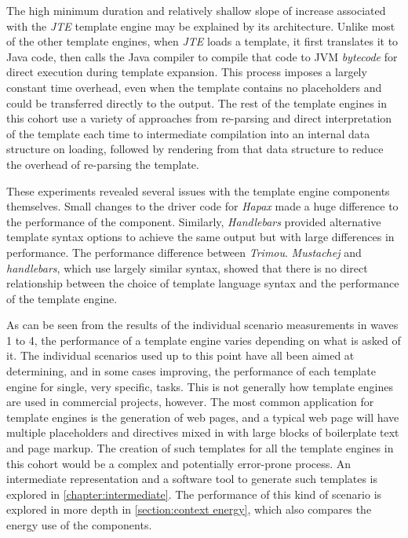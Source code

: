 The high minimum duration and relatively shallow slope of increase associated with the \emph{JTE} template engine may be explained by its architecture. Unlike most of the other template engines, when \emph{JTE} loads a template, it first translates it to Java code, then calls the Java compiler to compile that code to JVM \emph{bytecode} for direct execution during template expansion. This process imposes a largely constant time overhead, even when the template contains no placeholders and could be transferred directly to the output. The rest of the template engines in this cohort use a variety of approaches from re-parsing and direct interpretation of the template each time to intermediate compilation into an internal data structure on loading, followed by rendering from that data structure to reduce the overhead of re-parsing the template.

These experiments revealed several issues with the template engine components themselves. Small changes to the driver code for \emph{Hapax} made a huge difference to the performance of the component. Similarly, \emph{Handlebars} provided alternative template syntax options to achieve the same output but with large differences in performance. The performance difference between \emph{Trimou}. \emph{Mustachej} and \emph{handlebars}, which use largely similar syntax, showed that there is no direct relationship between the choice of template language syntax and the performance of the template engine.

As can be seen from the results of the individual scenario measurements in waves 1 to 4, the performance of a template engine varies depending on what is asked of it. The individual scenarios used up to this point have all been aimed at determining, and in some cases improving, the performance of each template engine for single, very specific, tasks. This is not generally how template engines are used in commercial projects, however. The most common application for template engines is the generation of web pages, and a typical web page will have multiple placeholders and directives mixed in with large blocks of boilerplate text and page markup. The creation of such templates for all the template engines in this cohort would be a complex and potentially error-prone process. An intermediate representation and a software tool to generate such templates is explored in \autoref{chapter:intermediate}. The performance of this kind of scenario is explored in more depth in \autoref{section:context energy}, which also compares the energy use of the components.

